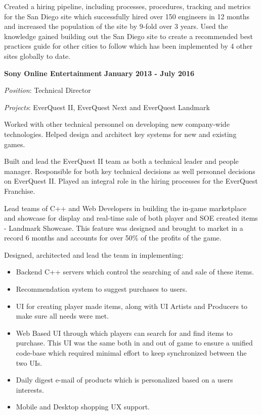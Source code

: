 \documentclass{article}
\begin{document}
\par
\vspace{\baselineskip}
Created a hiring pipeline, including processes, procedures, tracking and metrics for the San Diego site which successfully hired over 150 engineers in 12 months and increased the population of the site by 9-fold over 3 years.  
Used the knowledge gained building out the San Diego site to create a recommended best practices guide for other cities to follow which has been implemented by 4 other sites globally to date.  
\par
\vspace{\baselineskip}
{\bf Sony Online Entertainment}
\hfill {\bf January 2013 - July 2016}
\vspace{.03in}
\par
{\it Position}: Technical Director
\par
{\it Projects}: EverQuest II, EverQuest Next and EverQuest Landmark
\vspace{\baselineskip}
\par
Worked with other technical personnel on developing new company-wide
technologies.  Helped design and architect key systems for new and existing
games.
\par
\vspace{\baselineskip}
Built and lead the EverQuest II team as both a technical leader and people manager.  Responsible for both key technical decisions as well personnel decisions on EverQuest II.  Played an integral role in the hiring processes for the EverQuest Franchise.
\par
\vspace{\baselineskip}
Lead teams of C++ and Web Developers in building the
in-game marketplace and showcase for display and real-time sale of both player and SOE created items - 
Landmark Showcase.  This
feature was designed and brought to market in a record 6 months and accounts
for over 50\% of the profits of the game.
\par
\vspace{\baselineskip}
Designed, architected and lead the team in implementing: 
\begin{small}
\begin{itemize}
  \item Backend C++ servers which control the searching of and sale of these items.
  \item Recommendation system to suggest purchases to users.
  \item UI for creating player made items, along with UI Artists  and Producers to make sure all needs were met.
  \item Web Based UI through which players can search for and find items to purchase.  This UI was the same both in and out of game to ensure a unified code-base which required minimal effort to keep synchronized between the two UIs.
  \item Daily digest e-mail of products which is personalized based on a users interests.
  \item Mobile and Desktop shopping UX support.
\end{itemize}
\end{small}
\end{document}

